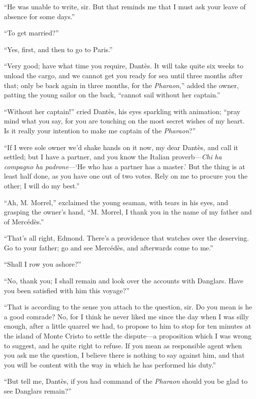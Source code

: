 “He was unable to write, sir. But that reminds me that I must ask your
leave of absence for some days.”

“To get married?”

“Yes, first, and then to go to Paris.”

“Very good; have what time you require, Dantès. It will take quite six
weeks to unload the cargo, and we cannot get you ready for sea until
three months after that; only be back again in three months, for the
\textit{Pharaon},” added the owner, patting the young sailor on the back,
“cannot sail without her captain.”

“Without her captain!” cried Dantès, his eyes sparkling with animation;
“pray mind what you say, for you are touching on the most secret wishes
of my heart. Is it really your intention to make me captain of the
\textit{Pharaon}?”

“If I were sole owner we’d shake hands on it now, my dear Dantès, and
call it settled; but I have a partner, and you know the Italian
proverb—\textit{Chi ha compagno ha padrone}—‘He who has a partner has a
master.’ But the thing is at least half done, as you have one out of
two votes. Rely on me to procure you the other; I will do my best.”

“Ah, M. Morrel,” exclaimed the young seaman, with tears in his eyes,
and grasping the owner’s hand, “M. Morrel, I thank you in the name of
my father and of Mercédès.”

“That’s all right, Edmond. There’s a providence that watches over the
deserving. Go to your father; go and see Mercédès, and afterwards come
to me.”

“Shall I row you ashore?”

“No, thank you; I shall remain and look over the accounts with
Danglars. Have you been satisfied with him this voyage?”

“That is according to the sense you attach to the question, sir. Do you
mean is he a good comrade? No, for I think he never liked me since the
day when I was silly enough, after a little quarrel we had, to propose
to him to stop for ten minutes at the island of Monte Cristo to settle
the dispute—a proposition which I was wrong to suggest, and he quite
right to refuse. If you mean as responsible agent when you ask me the
question, I believe there is nothing to say against him, and that you
will be content with the way in which he has performed his duty.”

“But tell me, Dantès, if you had command of the \textit{Pharaon} should you be
glad to see Danglars remain?”

